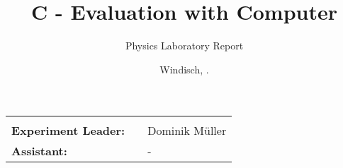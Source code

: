 \documentclass[final]{header/fhnwreport}
\title{\textbf{{\Huge C - Evaluation with Computer}}}
\author{{\Huge Physics Laboratory Report}}
\date{{\LARGE Windisch, \the\day.\MONTH \the\year}}
\begin{document}


\maketitle
\vfill
\begin{LARGE}
	\begin{tabularx}{\textwidth}{l p{0cm} X}
		\hline
		& & \\
		\textbf{Experiment Leader:} & & Dominik Müller \\
		\textbf{Assistant:} & & - \\
	\end{tabularx}
\end{LARGE}
\clearpage

\tableofcontents
\clearpage






\newpage


\ifdraft{
	\newpage
	\listoftodos[\section{To-Do}]
	\clearpage
}
{
}
\end{document}

